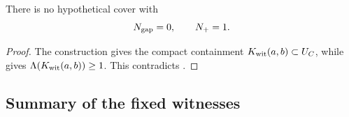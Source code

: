 \begin{theorem}
\label{thm:reader-zero-gap-obstruction}
There is no hypothetical cover with
\[
 N_{\rm gap}=0,
 \qquad
 N_+=1.
\]
\end{theorem}

\begin{proof}
The construction gives the compact containment
\(K_{\rm wit}(a,b)\subset U_C\), while
 gives
\(\Lambda(K_{\rm wit}(a,b))\ge1\).  This contradicts
.
\end{proof}

\subsection{Summary of the fixed witnesses}
